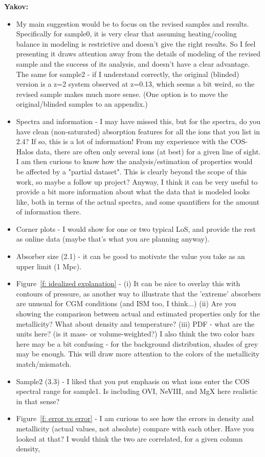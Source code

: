 \documentclass[fleqn,usenatbib]{mnras}
\begin{document}
\textbf{Yakov:}
\begin{itemize}
\item My main suggestion would be to focus on the revised samples and results. Specifically for sample0, it is very clear that assuming heating/cooling balance in modeling is restrictive and doesn't give the right results. So I feel presenting it draws attention away from the details of modeling of the revised sample and the success of its analysis, and doesn't have a clear advantage. The same for sample2 - if I understand correctly, the original (blinded) version is a z=2 system observed at z=0.13, which seems a bit weird, so the revised sample makes much more sense. (One option is to move the original/blinded samples to an appendix.)
\item Spectra and information - I may have missed this, but for the spectra, do you have clean (non-saturated) absorption features for all the ions that you list in 2.4? If so, this is a lot of information! From my experience with the COS-Halos data, there are often only several ions (at best) for a given line of sight. I am then curious to know how the analysis/estimation of properties would be affected by a "partial dataset". This is clearly beyond the scope of this work, so maybe a follow up project? Anyway, I think it can be very useful to provide a bit more information about what the data that is modeled looks like, both in terms of the actual spectra, and some quantifiers for the amount of information there.
\item Corner plots - I would show for one or two typical LoS, and provide the rest as online data (maybe that's what you are planning anyway).
\item Absorber size (2.1) - it can be good to motivate the value you take as an upper limit (1 Mpc).
\item Figure~\ref{f: idealized explanation} - 
(i) It can be nice to overlay this with contours of pressure, as another way to illustrate that the 'extreme' absorbers are unusual for CGM conditions (and ISM too, I think...)
(ii) Are you showing the comparison between actual and estimated properties only for the metallicity? What about density and temperature?
(iii) PDF - what are the units here? (is it mass- or volume-weighted?) I also think the two color bars here may be a bit confusing - for the background distribution, shades of grey may be enough. This will draw more attention to the colors of the metallicity match/mismatch.
\item Sample2 (3.3) - I liked that you put emphasis on what ions enter the COS spectral range for sample1. Is including OVI, NeVIII, and MgX here realistic in that sense?
\item Figure~\ref{f: error vs error} - I am curious to see how the errors in density and metallicity (actual values, not absolute) compare with each other. Have you looked at that? I would think the two are correlated, for a given column density,
\end{itemize}
\end{document}
